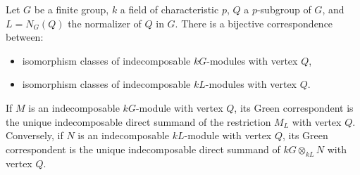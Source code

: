Let $G$ be a finite group, $k$ a field of characteristic $p$, $Q$ a $p$-subgroup of $G$, and $L = N_G(Q)$ the normalizer of $Q$ in $G$. There is a bijective correspondence between:
\begin{itemize}
\item isomorphism classes of indecomposable $kG$-modules with vertex $Q$,
\item isomorphism classes of indecomposable $kL$-modules with vertex $Q$.
\end{itemize}
If $M$ is an indecomposable $kG$-module with vertex $Q$, its Green correspondent is the unique indecomposable direct summand of the restriction $M_L$ with vertex $Q$. Conversely, if $N$ is an indecomposable $kL$-module with vertex $Q$, its Green correspondent is the unique indecomposable direct summand of $kG \otimes_{kL} N$ with vertex $Q$.
